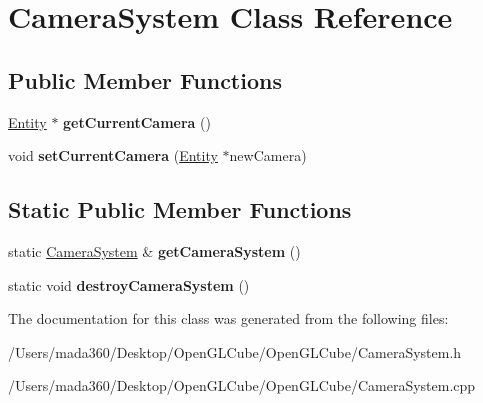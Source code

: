\hypertarget{class_camera_system}{}\section{Camera\+System Class Reference}
\label{class_camera_system}
\subsection*{Public Member Functions}
\begin{DoxyCompactItemize}
\item 
\hypertarget{class_camera_system_ab239296f4d98cc67e52b707e03158c3e}{}\hyperlink{class_entity}{Entity} $\ast$ {\bfseries get\+Current\+Camera} ()\label{class_camera_system_ab239296f4d98cc67e52b707e03158c3e}

\item 
\hypertarget{class_camera_system_a3f76e690e088e4cd7b4f554e0ae8f370}{}void {\bfseries set\+Current\+Camera} (\hyperlink{class_entity}{Entity} $\ast$new\+Camera)\label{class_camera_system_a3f76e690e088e4cd7b4f554e0ae8f370}

\end{DoxyCompactItemize}
\subsection*{Static Public Member Functions}
\begin{DoxyCompactItemize}
\item 
\hypertarget{class_camera_system_a52ad0c36f96291bef889a896b252b355}{}static \hyperlink{class_camera_system}{Camera\+System} \& {\bfseries get\+Camera\+System} ()\label{class_camera_system_a52ad0c36f96291bef889a896b252b355}

\item 
\hypertarget{class_camera_system_add435683e79527bec70a83eac91584b2}{}static void {\bfseries destroy\+Camera\+System} ()\label{class_camera_system_add435683e79527bec70a83eac91584b2}

\end{DoxyCompactItemize}


The documentation for this class was generated from the following files\+:\begin{DoxyCompactItemize}
\item 
/\+Users/mada360/\+Desktop/\+Open\+G\+L\+Cube/\+Open\+G\+L\+Cube/Camera\+System.\+h\item 
/\+Users/mada360/\+Desktop/\+Open\+G\+L\+Cube/\+Open\+G\+L\+Cube/Camera\+System.\+cpp\end{DoxyCompactItemize}
